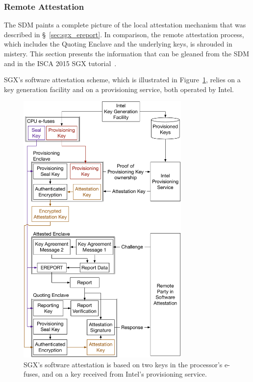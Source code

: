 

\subsubsection{Remote Attestation}
\label{sec:sgx_quoting_enclave}

The SDM paints a complete picture of the local attestation mechanism that was
described in \S~\ref{sec:sgx_ereport}. In comparison, the remote attestation
process, which includes the Quoting Enclave and the underlying keys, is
shrouded in mistery. This section presents the information that can be gleaned
from the SDM and in the ISCA 2015 SGX tutorial~\cite{intel2015iscasgx}.


SGX's software attestation scheme, which is illustrated in
Figure~\ref{fig:sgx_attestation_keys}, relies on a key generation facility and
on a provisioning service, both operated by Intel.

\begin{figure}[hbt]
  \centering
  \includegraphics[width=85mm]{figures/sgx_attestation_keys.pdf}
  \caption{
    SGX's software attestation is based on two keys in the processor's e-fuses,
    and on a key received from Intel's provisioning service.
  }
  \label{fig:sgx_attestation_keys}
\end{figure}

